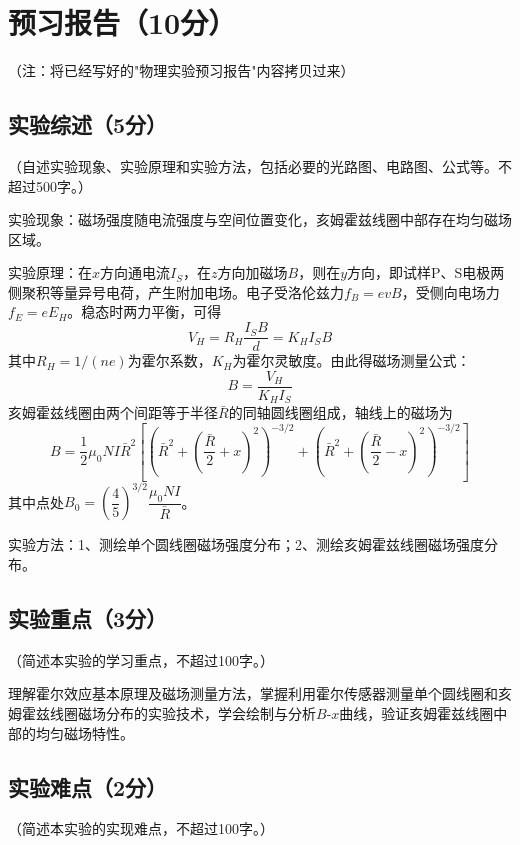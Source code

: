 \documentclass{Phyport}
\begin{document}
\setcounter{page}{0}
\makecover

\section{预习报告（10分）}
（注：将已经写好的"物理实验预习报告"内容拷贝过来）

\subsection{实验综述（5分）}
（自述实验现象、实验原理和实验方法，包括必要的光路图、电路图、公式等。不超过500字。）

实验现象：磁场强度随电流强度与空间位置变化，亥姆霍兹线圈中部存在均匀磁场区域。

实验原理：在$x$方向通电流$I_S$，在$z$方向加磁场$B$，则在$y$方向，即试样P、S电极两侧聚积等量异号电荷，产生附加电场。电子受洛伦兹力$f_B=evB$，受侧向电场力$f_E=eE_H$。稳态时两力平衡，可得
\begin{equation}
    V_H = R_H \frac{I_S B}{d} = K_H I_S B
\end{equation}
其中$R_H=1/(ne)$为霍尔系数，$K_H$为霍尔灵敏度。由此得磁场测量公式：
\begin{equation}
    B = \frac{V_H}{K_H I_S}
\end{equation}
亥姆霍兹线圈由两个间距等于半径$\bar{R}$的同轴圆线圈组成，轴线上的磁场为
\begin{equation}
    B = \frac{1}{2}\mu_0 N I \bar{R}^2 \left[\left(\bar{R}^2 + \left(\frac{\bar{R}}{2}+x\right)^2\right)^{-3/2} + \left(\bar{R}^2 + \left(\frac{\bar{R}}{2}-x\right)^2\right)^{-3/2}\right]
\end{equation}
其中点处$B_0 = \left(\dfrac{4}{5}\right)^{3/2} \dfrac{\mu_0 N I}{\bar{R}}$。

实验方法：1、测绘单个圆线圈磁场强度分布；2、测绘亥姆霍兹线圈磁场强度分布。

\subsection{实验重点（3分）}
（简述本实验的学习重点，不超过100字。）

理解霍尔效应基本原理及磁场测量方法，掌握利用霍尔传感器测量单个圆线圈和亥姆霍兹线圈磁场分布的实验技术，学会绘制与分析$B$-$x$曲线，验证亥姆霍兹线圈中部的均匀磁场特性。

\subsection{实验难点（2分）}
（简述本实验的实现难点，不超过100字。）
\end{document}
